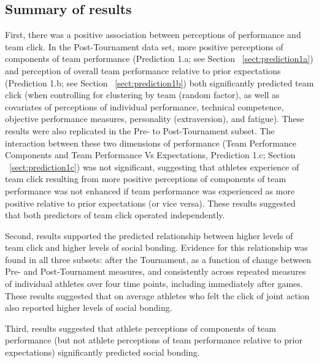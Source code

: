 \begin{CJK}{UTF8}{gbsn}
\subsection{Summary of results}

First, there was a positive association between perceptions of performance and team click.  In the Post-Tournament data set, more positive perceptions of components of team performance (Prediction 1.a; see Section ~\ref{sect:prediction1a}) and perception of overall team performance relative to prior expectations (Prediction 1.b; see Section ~\ref{sect:prediction1b}) both significantly predicted team click (when controlling for clustering by team (random factor), as well as covariates of perceptions of individual performance, technical competence, objective performance measures, personality (extraversion), and fatigue).  These results were also replicated in the Pre- to Post-Tournament subset. The interaction between these two dimensions of performance (Team Performance Components and Team Performance Vs Expectations, Prediction 1.c; Section ~\ref{sect:prediction1c}) was not significant, suggesting that athletes experience of team click resulting from more positive perceptions of components of team performance was not enhanced if   team performance was experienced as more positive relative to prior expectations (or vice versa).  These results suggested that both predictors of team click operated independently.


Second, results supported the predicted relationship between higher levels of team click and higher levels of social bonding.  Evidence for this relationship was found in all three subsets: after the Tournament, as a function of change between Pre- and Post-Tournament measures, and consistently across repeated measures of individual athletes over four time points, including immediately after games.  These results suggested that on average athletes who felt the click of joint action also reported higher levels of social bonding.


Third, results suggested that athlete perceptions of components of team performance (but not athlete perceptions of team performance relative to prior expectations) significantly predicted social bonding.


\end{CJK}
